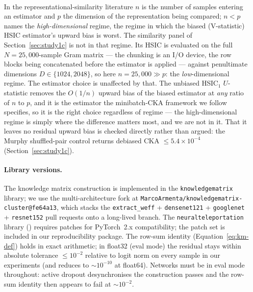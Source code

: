 \paragraph{}
\begin{clarifybox}
In the representational-similarity literature $n$ is the number of samples
entering an estimator and $p$ the dimension of the representation being
compared; $n<p$ names the \emph{high-dimensional} regime, the regime in which
the biased (V-statistic) HSIC estimator's upward bias is worst. The similarity
panel of Section~\ref{sec:study1c} is not in that regime. Its HSIC is evaluated
on the full $N=25{,}000$-sample Gram matrix --- the chunking is an I/O device,
the row blocks being concatenated before the estimator is applied --- against
penultimate dimensions $D\in\{1024,2048\}$, so here $n = 25{,}000 \gg p$: the
\emph{low}-dimensional regime. The estimator choice is unaffected by that. The
unbiased HSIC$_1$ $U$-statistic removes the $O(1/n)$ upward bias of the biased
estimator at \emph{any} ratio of $n$ to $p$, and it is the estimator the
minibatch-CKA framework we follow specifies, so it is the right choice
regardless of regime --- the high-dimensional regime is simply where the
difference matters most, and we are not in it. That it leaves no residual
upward bias is checked directly rather than argued: the Murphy shuffled-pair
control returns debiased CKA $\le 5.4\times10^{-4}$
(Section~\ref{sec:study1c}).
\end{clarifybox}

\paragraph{Library versions.}
The knowledge matrix construction is implemented in the
\texttt{knowledgematrix} library; we use the multi-architecture fork at
\texttt{MarcoArmenta/knowledgematrix-cluster@fe64a13}, which stacks
the \texttt{extract\_weff} + \texttt{densenet121} + \texttt{googlenet}
+ \texttt{resnet152} pull requests onto a long-lived branch.
The \texttt{neuralteleportation} library
(\citealt{armenta2024neural}) requires patches for PyTorch~2.x
compatibility; the patch set is included in our reproducibility
package. The row-sum identity
(Equation~\ref{eq:km-def}) holds in exact arithmetic; in float32
(eval mode) the residual stays within absolute tolerance
$\le 10^{-2}$ relative to logit norm on every sample in our
experiments (and reduces to $\sim10^{-10}$ at float64). Networks must
be in eval mode throughout: active dropout desynchronises the
construction passes and the row-sum identity then appears to fail at
$\sim10^{-2}$.


